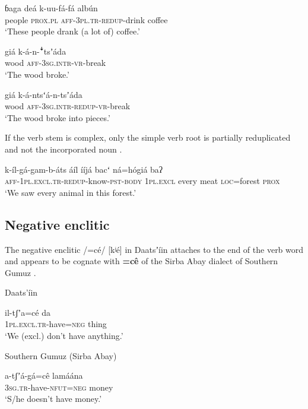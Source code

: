 \documentclass[output=paper]{langsci/langscibook}
\begin{document}
\ea\label{ex:ahlandc:37}
\gll
ɓaga  de\'{a}  k-uu-f\'{a}-f\'{a}   alb\'{u}n   \\
people  \textsc{prox.pl}  \textsc{aff-3pl.tr-redup}{}-drink   coffee \\
\glt
‘These people drank (a lot of) coffee.’ 
\z

\ea\label{ex:ahlandc:38}
\gll
gi\'{a}     k-\'{a}-n-\textsf{ꜜ}tsʼ\'{a}da \\
wood \textsc{aff-3sg.intr}{}-\textsc{vr-}break \\
\glt
‘The wood broke.’
\z

\ea\label{ex:ahlandc:39}
\gll
gi\'{a}       k-\'{a}-ntsʻ\'{a}-n-tsʼ\'{a}da  \\
wood  \textsc{aff-3sg.intr}{}-\textsc{redup}{}-\textsc{vr}{}-break \\
\glt
 ‘The wood broke into pieces.’
\z

If the verb stem is complex, only the simple verb root is partially reduplicated and not the incorporated noun . 

\ea\label{ex:ahlandc:40}
\gll
k-íl-g\'{a}-gam-b-\'{a}ts                                        áíl           ííjá      bacʻ   n\'{a}=h\'{o}giá  baʔ \\
\textsc{aff-1pl.excl.tr-redup}{}-know-\textsc{pst-body} \textsc{1pl.excl} every  meat  \textsc{loc}=forest \textsc{prox} \\
\glt
‘We saw every animal in this forest.’
\z


\subsection{Negative enclitic}\label{sec:ahlandc:4.8}

The negative enclitic /=c\'{e}/ [kʲé] in Daatsʼ\'{i}in  attaches to the end of the verb word and appears to be cognate with \textbf{=c\^{e}} of the Sirba Abay dialect of Southern Gumuz  \citep[cf.][241-242]{Ahland2012}. 

\ea\label{ex:ahlandc:41}
Daats’\'{i}in

\gll
il-tʃʼa=cé   da \\
\textsc{  1pl.excl.tr}{}-have=\textsc{neg}     thing \\
\glt
  ‘We (excl.) don’t have anything.’
\z

\ea\label{ex:ahlandc:42}
Southern Gumuz (Sirba Abay)

\gll
  a-tʃʼ\'{a}-g\'{a}=c\^{e}                      lam\'{a}\'{a}na \\
\textsc{  3sg.tr}{}-have-\textsc{nfut=neg  } money \\
\glt
  ‘S/he doesn’t have money.’
\z
\end{document}
